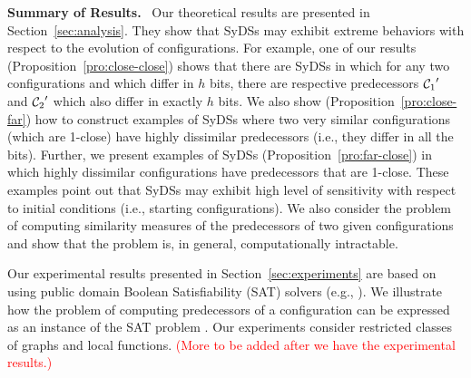 \noindent
\textbf{Summary of Results.}~ 
Our theoretical results are presented in Section~\ref{sec:analysis}.
They  show that SyDSs may exhibit
extreme behaviors with respect to the evolution of configurations.
For example, one of our results (Proposition~\ref{pro:close-close})  
shows that there are SyDSs in which
for any two configurations \calcone{} and \calctwo{} 
which differ in $h$ bits, there are respective predecessors 
$\mbox{$\mathcal{C}_{1}$}'$ and $\mbox{$\mathcal{C}_{2}$}'$ which also differ in exactly $h$ bits.
We also show (Proposition~\ref{pro:close-far})
how to construct examples of SyDSs where two very similar 
configurations (which are 1-close) have highly dissimilar predecessors
(i.e., they differ in all the bits).
Further, we present examples of SyDSs (Proposition~\ref{pro:far-close})
in which highly dissimilar configurations have predecessors that are 1-close.
These examples point out that SyDSs may exhibit high level of sensitivity
with respect to initial conditions (i.e., starting configurations).
We also consider the problem of computing similarity
measures of the predecessors of two given configurations and show that
the problem is, in general, computationally intractable.

Our experimental results presented in Section~\ref{sec:experiments}
are based on using public domain Boolean Satisfiability
(SAT) solvers (e.g., \cite{sat-live}).
We illustrate how the problem of computing predecessors of a
configuration can be expressed as an instance of the SAT
problem \cite{GJ-1979}.
Our experiments consider restricted classes of graphs and local functions.
\textcolor{red}{(More to be added after we have the experimental results.)}

\smallskip

